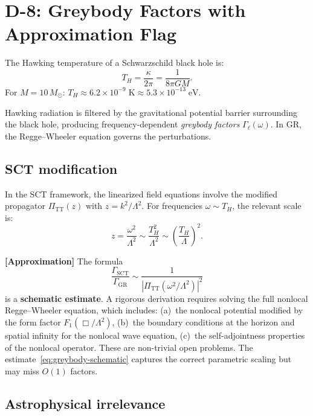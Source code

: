 \documentclass[11pt,a4paper]{article}
\newcommand{\PiTT}{\Pi_{\mathrm{TT}}}
\theoremstyle{plain}
\theoremstyle{definition}
\newcommand{\approximation}[1]{%
  \par\smallskip\noindent
  \colorbox{orange!10}{\parbox{\dimexpr\linewidth-2\fboxsep}{%
    \textcolor{orange!60!black}{\textbf{[Approximation]}} #1}}%
  \par\smallskip}
\begin{document}
\section{D-8: Greybody Factors with Approximation Flag}
\label{sec:D8}

The Hawking temperature of a Schwarzschild black hole is:
\begin{equation}\label{eq:hawking-T}
  T_H = \frac{\kappa}{2\pi} = \frac{1}{8\pi G M}.
\end{equation}
For $M = 10\,M_\odot$: $T_H \approx 6.2 \times 10^{-9}\;\mathrm{K}
\approx 5.3 \times 10^{-13}\;\mathrm{eV}$.

Hawking radiation is filtered by the gravitational potential barrier
surrounding the black hole, producing frequency-dependent \emph{greybody
factors} $\Gamma_\ell(\omega)$. In GR, the Regge--Wheeler equation
governs the perturbations.

\subsection{SCT modification}

In the SCT framework, the linearized field equations involve the
modified propagator $\PiTT(z)$ with $z = k^2/\Lambda^2$. For
frequencies $\omega \sim T_H$, the relevant scale is:
\begin{equation}
  z = \frac{\omega^2}{\Lambda^2} \sim \frac{T_H^2}{\Lambda^2}
  \sim \left(\frac{T_H}{\Lambda}\right)^2.
\end{equation}

\approximation{The formula
\begin{equation}\label{eq:greybody-schematic}
  \frac{\Gamma_{\mathrm{SCT}}}{\Gamma_{\mathrm{GR}}}
  \sim \frac{1}{\left|\PiTT(\omega^2/\Lambda^2)\right|^2}
\end{equation}
is a \textbf{schematic estimate}. A rigorous derivation requires solving
the full nonlocal Regge--Wheeler equation, which includes:
(a)~the nonlocal potential modified by the form factor $F_1(\Box/\Lambda^2)$,
(b)~the boundary conditions at the horizon and spatial infinity for the
nonlocal wave equation,
(c)~the self-adjointness properties of the nonlocal operator.
These are non-trivial open problems. The estimate~\eqref{eq:greybody-schematic}
captures the correct parametric scaling but may miss $O(1)$ factors.}

\subsection{Astrophysical irrelevance}
\end{document}
